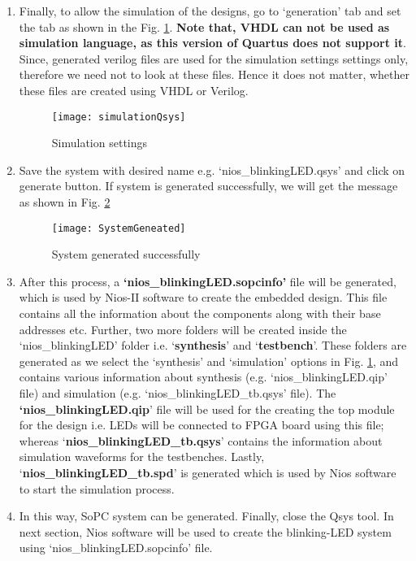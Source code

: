 \begin{enumerate}
	
	\item Finally, to allow the simulation of the designs, go to `generation' tab and set the tab as shown in the Fig. \ref{fig:simulationQsys}. \textbf{Note that, VHDL can not be used as simulation language, as this version of Quartus does not support it}. Since,  generated verilog files are used for the simulation settings settings only, therefore we need not to look at these files. Hence it does not matter, whether these files are created using VHDL or Verilog. 
	\begin{figure}[!h]
		\centering
		\texttt{[image: simulationQsys]}
		\caption{Simulation settings}
		\label{fig:simulationQsys}
	\end{figure}
	
	
	\item Save the system with desired name e.g. `nios\_blinkingLED.qsys' and click on generate button. If system is generated successfully, we will get the message as shown in Fig. \ref{fig:SystemGeneated}
	\begin{figure}[!h]
		\centering
		\texttt{[image: SystemGeneated]}
		\caption{System generated successfully}
		\label{fig:SystemGeneated}
	\end{figure}	
	
	\item After this process, a \textbf{`nios\_blinkingLED.sopcinfo'} file will be generated, which is used by Nios-II software to create the embedded design. This file contains all the information about the components along with their base addresses etc. Further, two more folders will be created inside the `nios\_blinkingLED' folder i.e. `\textbf{synthesis}' and `\textbf{testbench}'. These folders are generated as we select the `synthesis' and `simulation' options in Fig. \ref{fig:simulationQsys}, and contains various information about synthesis (e.g. `nios\_blinkingLED.qip' file) and simulation (e.g. `nios\_blinkingLED\_tb.qsys' file). The \textbf{`nios\_blinkingLED.qip}' file will be used for the creating the top module for the design i.e. LEDs will be connected to FPGA board using this file; whereas `\textbf{nios\_blinkingLED\_tb.qsys}' contains the information about simulation waveforms for the testbenches. Lastly, `\textbf{nios\_blinkingLED\_tb.spd}' is generated which is used by Nios software to start the simulation process. 
	
	\item In this way, SoPC system can be generated. Finally, close the Qsys tool. 	In next section, Nios software will be used to create the blinking-LED system using `nios\_blinkingLED.sopcinfo' file.
\end{enumerate}

